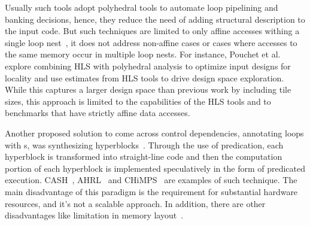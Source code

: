
Usually such tools adopt polyhedral tools to automate loop pipelining and banking decisions, hence, they reduce the need of adding structural description to the input code.
But such techniques are limited to only affine accesses withing a single loop nest~\cite{wang_2014_theory}, it does not address non-affine cases or cases where accesses to the same memory occur in multiple loop nests.
For instance, Pouchet et al.~\cite{pouchet_2013_polyhedral}  explore combining HLS with polyhedral analysis to optimize input designs for locality and use estimates from HLS tools to drive design space exploration.
While this captures a larger design space than previous work by including tile sizes, this approach is limited to the capabilities of the HLS tools and to benchmarks that have strictly affine data accesses.

Another proposed solution to come across control dependencies, annotating loops with s, was synthesizing hyperblocks~\cite{hyperblock}.
Through the use of predication, each hyperblock is transformed into straight-line code and then the computation portion of each hyperblock is implemented speculatively in the form of predicated execution.
CASH~\cite{budiu_cash_2002, budiu_pegasus_2002}, AHRL~\cite{ahrl} and CHiMPS~\cite{chimps} are examples of such technique.
The main disadvantage of this paradigm is the requirement for substantial hardware resources, and it's not a scalable approach. 
In addition, there are other disadvantages like limitation in memory layout~\cite{spatial_computation}.

